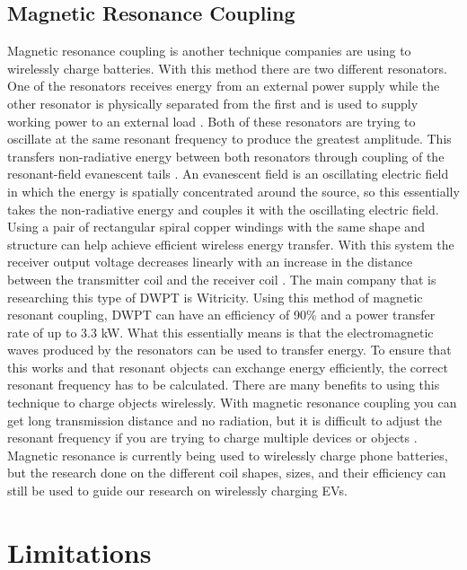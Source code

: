 \subsection{Magnetic Resonance Coupling}
Magnetic resonance coupling is another technique companies are using to wirelessly charge batteries. 
With this method there are two different resonators. One of the resonators receives energy from an 
external power supply while the other resonator is physically separated from the first and is used to 
supply working power to an external load \cite{ho_comparative_2011}. Both of these resonators are trying 
to oscillate at the same resonant frequency to produce the greatest amplitude. This transfers non-radiative 
energy between both resonators through coupling of the resonant-field evanescent tails \cite{ho_comparative_2011}. 
An evanescent field is an oscillating electric field in which the energy is spatially concentrated around the source, 
so this essentially takes the non-radiative energy and couples it with the oscillating electric field. Using a pair 
of rectangular spiral copper windings with the same shape and structure can help achieve efficient wireless energy 
transfer. With this system the receiver output voltage decreases linearly with an increase in the distance between 
the transmitter coil and the receiver coil \cite{ho_comparative_2011}. The main company that is researching this 
type of DWPT is Witricity. Using this method of magnetic resonant coupling, DWPT can have an efficiency of 90\% 
and a power transfer rate of up to 3.3 kW. What this essentially means is that the electromagnetic waves produced 
by the resonators can be used to transfer energy. To ensure that this works and that resonant objects can exchange 
energy efficiently, the correct resonant frequency has to be calculated. There are many benefits to using this 
technique to charge objects wirelessly. With magnetic resonance coupling you can get long transmission distance 
and no radiation, but it is difficult to adjust the resonant frequency if you are trying to charge multiple devices 
or objects \cite{parmesh_wireless_2017}. Magnetic resonance is currently being used to wirelessly charge phone 
batteries, but the research done on the different coil shapes, sizes, and their efficiency can still be used to guide 
our research on wirelessly charging EVs.

\section{Limitations}
